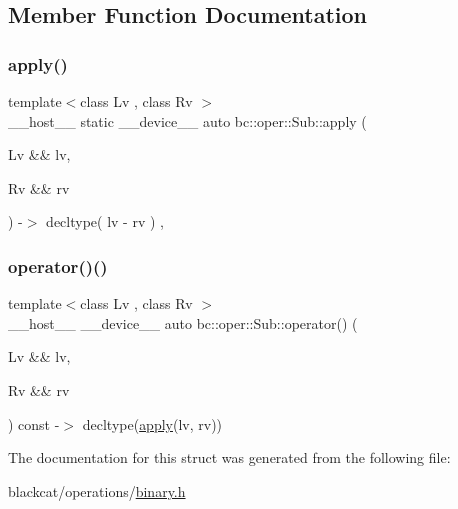 \subsection{Member Function Documentation}
\mbox{\label{structbc_1_1oper_1_1Sub_aea5be4cb2773cbfdb2bce202a1a05e1d}} 
\subsubsection{\texorpdfstring{apply()}{apply()}}
{\footnotesize\ttfamily template$<$class Lv , class Rv $>$ \\
\+\_\+\+\_\+host\+\_\+\+\_\+ static \+\_\+\+\_\+device\+\_\+\+\_\+ auto bc\+::oper\+::\+Sub\+::apply (\begin{DoxyParamCaption}\item[{Lv \&\&}]{lv,  }\item[{Rv \&\&}]{rv }\end{DoxyParamCaption}) -\/$>$ decltype( lv -\/ rv ) \hspace{0.3cm}{\ttfamily [inline]}, {\ttfamily [static]}}

\mbox{\label{structbc_1_1oper_1_1Sub_af0f4415db3edd52cc76873904980b57b}} 
\subsubsection{\texorpdfstring{operator()()}{operator()()}}
{\footnotesize\ttfamily template$<$class Lv , class Rv $>$ \\
\+\_\+\+\_\+host\+\_\+\+\_\+ \+\_\+\+\_\+device\+\_\+\+\_\+ auto bc\+::oper\+::\+Sub\+::operator() (\begin{DoxyParamCaption}\item[{Lv \&\&}]{lv,  }\item[{Rv \&\&}]{rv }\end{DoxyParamCaption}) const -\/$>$ decltype(\hyperlink{structbc_1_1oper_1_1Sub_aea5be4cb2773cbfdb2bce202a1a05e1d}{apply}(lv, rv)) \hspace{0.3cm}{\ttfamily [inline]}}



The documentation for this struct was generated from the following file\+:\begin{DoxyCompactItemize}
\item 
blackcat/operations/\hyperlink{binary_8h}{binary.\+h}\end{DoxyCompactItemize}
